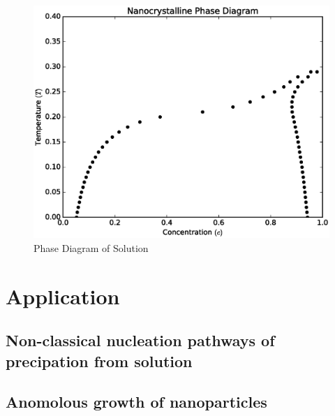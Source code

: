 \documentclass[showkeys, prb, reprint]{revtex4-1}
\begin{document}
\begin{figure}
	\includegraphics[scale=0.3]{solution.eps}
	\caption{\label{precip} Phase Diagram of Solution}
\end{figure}

\section{Application}

\subsection{Non-classical nucleation pathways of precipation from solution}

\subsection{Anomolous growth of nanoparticles}


\end{document}
